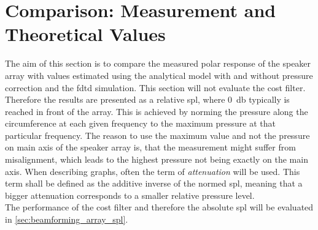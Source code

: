 \section{Comparison: Measurement and Theoretical Values}\label{sec:meas_vs_theory}

The aim of this section is to compare the measured polar response of the speaker array with values estimated using the analytical model with and without pressure correction and the \gls{fdtd} simulation. This section will not evaluate the cost filter. Therefore the results are presented as a relative \gls{spl}, where \SI{0}{\decibel} typically is reached in front of the array. This is achieved by norming the pressure along the circumference at each given frequency to the maximum pressure at that particular frequency.
The reason to use the maximum value and not the pressure on main axis of the speaker array is, that the measurement might suffer from misalignment, which leads to the highest pressure not being exactly on the main axis. 
When describing graphs, often the term of \textit{attenuation} will be used. This term shall be defined as the additive inverse of the normed \gls{spl}, meaning that a bigger attenuation corresponds to a smaller relative pressure level.\\
The performance of the cost filter and therefore the absolute \gls{spl} will be evaluated in \autoref{sec:beamforming_array_spl}.\\

